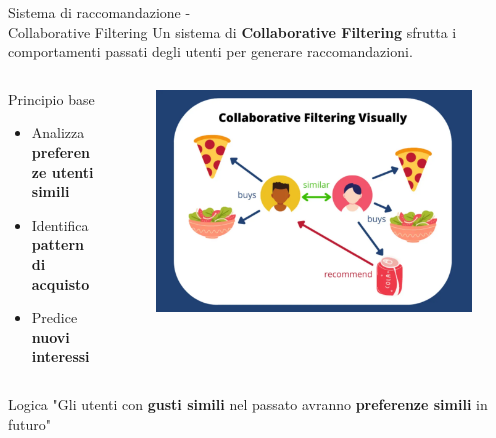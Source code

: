 \documentclass{beamer}
\begin{document}
	\begin{frame}{Sistema di raccomandazione -\\ Collaborative Filtering}
		Un sistema di \textbf{Collaborative Filtering} sfrutta i comportamenti passati degli utenti per generare raccomandazioni.

		\begin{columns}
			\begin{column}{0.6\textwidth}
				\begin{block}{Principio base}
					\begin{itemize}
						\item Analizza \textbf{preferenze utenti simili}
						\item Identifica \textbf{pattern di acquisto}
						\item Predice \textbf{nuovi interessi}
					\end{itemize}
				\end{block}
			\end{column}
			\begin{column}{0.38\textwidth}
				\begin{figure}
					\centering
					\includegraphics[width=\textwidth]{Collaborative-Filtering.png}
				\end{figure}
			\end{column}
		\end{columns}

		\begin{alertblock}{Logica}
			"Gli utenti con \textbf{gusti simili} nel passato avranno \textbf{preferenze simili} in futuro"
		\end{alertblock}
	\end{frame}
\end{document}
